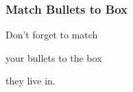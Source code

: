 \begin{frame}\frametitle{Match Bullets to Box}

{
  \begin{grassgreenitemize}
  \item Don't forget to match \item your bullets to the box \item they live in. 
  \end{grassgreenitemize}
}

\end{frame}

